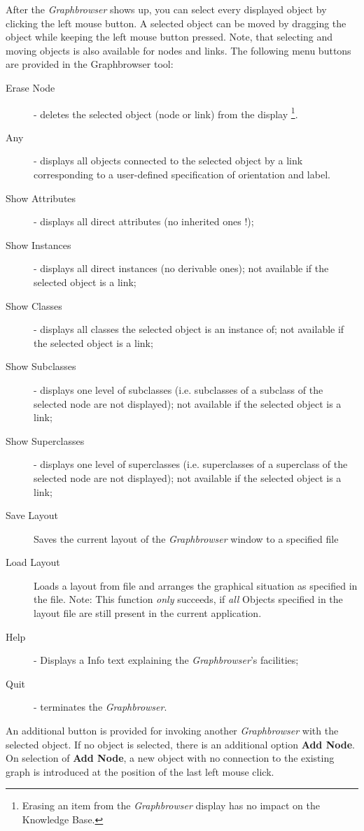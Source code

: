 After the {\em Graphbrowser}  shows up, you can select every displayed object by clicking the left mouse button. A selected object can be moved by dragging the object while keeping the left mouse button pressed. Note, that selecting and moving objects is also available for nodes and links. The following menu buttons are provided in the {\rm Graphbrowser} tool:

\begin{description}
\item[Erase Node] - deletes the selected object (node or link) from the display \footnote{Erasing an item from the {\em Graphbrowser} display has no impact on the Knowledge Base.}.
\item[Any] - displays all objects connected to the selected object by a link corresponding to a user-defined specification of orientation and label.
\item[Show Attributes] -  displays all  direct attributes (no inherited ones !);
\item[Show Instances] - displays all  direct instances (no derivable ones); not available if the selected object is a link;
\item[Show Classes] - displays all classes the selected object is an instance of; not available if the selected object is a link;
\item[Show Subclasses] - displays one level of subclasses (i.e. subclasses of a subclass of the selected node are not displayed); not available if the selected object is a link;
\item[Show Superclasses] - displays one level of superclasses (i.e. superclasses of a superclass of the selected node are not displayed); not available if the selected object is a link;
\item[Save Layout] Saves the current layout of the {\em Graphbrowser}  window to a specified file

\item[Load Layout] Loads a layout from file and arranges the graphical 
situation as specified in the file. Note: This function {\em only} 
succeeds, if {\em all} Objects specified in the layout file are still 
present in the current application.

\item[Help] -  Displays a Info text explaining the {\em Graphbrowser}'s facilities;
\item[Quit] - terminates the {\em Graphbrowser}.
\end{description}


An additional button is provided for invoking another {\em Graphbrowser}  with the selected object. If no object is selected, there is an additional option {\bf Add Node}. On selection of {\bf Add Node}, a new object with no connection to the existing graph is introduced at the position of the last left mouse click.


